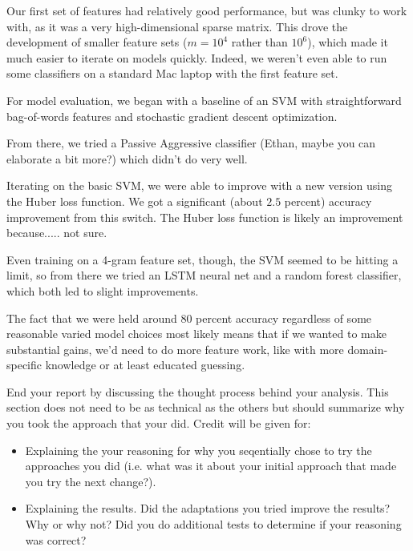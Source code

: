 \documentclass[11pt]{article}
\begin{document}
Our first set of features had relatively good performance, but was clunky to work with, as it was a very high-dimensional sparse matrix. This drove the development of smaller feature sets ($m = 10^4$ rather than $10^6$), which made it much easier to iterate on models quickly. Indeed, we weren't even able to run some classifiers on a standard Mac laptop with the first feature set.

For model evaluation, we began with a baseline of an SVM with straightforward bag-of-words features and stochastic gradient descent optimization.

From there, we tried a Passive Aggressive classifier (Ethan, maybe you can elaborate a bit more?) which didn't do very well.

Iterating on the basic SVM, we were able to improve with a new version using the Huber loss function. We got a significant (about $2.5$ percent) accuracy improvement from this switch. The Huber loss function is likely an improvement because..... not sure.

Even training on a 4-gram feature set, though, the SVM seemed to be hitting a limit, so from there we tried an LSTM neural net and a random forest classifier, which both led to slight improvements.

The fact that we were held around $80$ percent accuracy regardless of some reasonable varied model choices most likely means that if we wanted to make substantial gains, we'd need to do more feature work, like with more domain-specific knowledge or at least educated guessing. 

\pagebreak


End your report by discussing the thought process behind your
analysis. This section does not need to be as technical as the others 
but should summarize why you took the approach that your did. Credit will be given for:

  \begin{itemize}
  \item Explaining the your reasoning for why you seqentially chose to
    try the approaches you did (i.e. what was it about your initial
    approach that made you try the next change?).  
  \item Explaining the results.  Did the adaptations you tried improve
    the results?  Why or why not?  Did you do additional tests to
    determine if your reasoning was correct?  
  \end{itemize}
 
\end{document}
